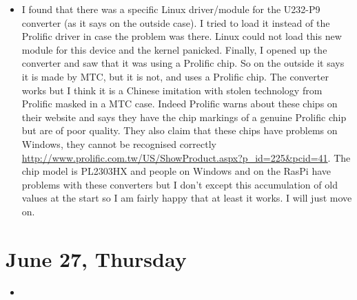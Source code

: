 \documentclass[a4paper,12pt]{article}
\begin{document}
\begin{itemize}
	\item I found that there was a specific Linux driver/module for the U232-P9 converter (as it says on the outside case). I tried to load it instead of the Prolific driver in case the problem was there. Linux could not load this new module for this device and the kernel panicked. Finally, I opened up the converter and saw that it was using a Prolific chip. So on the outside it says it is made by MTC, but it is not, and uses a Prolific chip. The converter works but I think it is a Chinese imitation with stolen technology from Prolific masked in a MTC case. Indeed Prolific warns about these chips on their website and says they have the chip markings of a genuine Prolific chip but are of poor quality. They also claim that these chips have problems on Windows, they cannot be recognised correctly \url{http://www.prolific.com.tw/US/ShowProduct.aspx?p_id=225&pcid=41}. The chip model is PL2303HX and people on Windows and on the RasPi have problems with these converters but I don't except this accumulation of old values at the start so I am fairly happy that at least it works. I will just move on.
\end{itemize}

\section{June 27, Thursday}

\begin{itemize}
	\item 
\end{itemize}

\newpage


\end{document}
